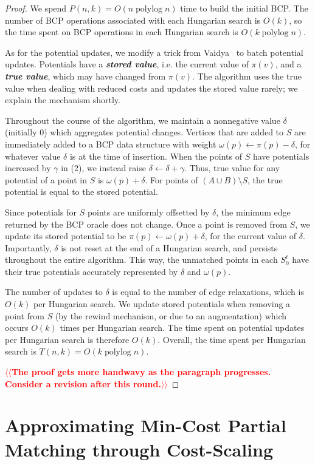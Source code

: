 \documentclass[a4paper,UKenglish]{socg-lipics-v2018}
\makeatletter
\def\note#1{\textcolor{red}{{#1}}}
\def\polylog{\mathop{\mathrm{polylog}}}
\theoremstyle{plain}
\numberwithin{figure}{section}
\def\EMPH#1{\textbf{\emph{\boldmath #1}}}
\def\n@te#1{\textsf{\boldmath \textbf{$\langle\!\langle$#1$\rangle\!\rangle$}}\leavevmode}
\def\note#1{\textcolor{red}{\n@te{#1}}}
\makeatother
\begin{document}
\begin{proof}
We spend $P(n, k) = O(n \polylog n)$ time to build the initial BCP.
The number of BCP operations associated with each Hungarian search is
$O(k)$, so the time spent on BCP operations in each Hungarian search
is $O(k \polylog n)$.

As for the potential updates, we modify a trick from Vaidya~\cite{Vaidya89} to
batch potential updates.
Potentials have a \EMPH{stored value}, i.e. the current value of $\pi(v)$,
and a \EMPH{true value}, which may have changed from $\pi(v)$.
The algorithm uses the true value when dealing with reduced costs and updates
the stored value rarely; we explain the mechanism shortly.

Throughout the course of the algorithm, we maintain a nonnegative value
$\delta$ (initially 0) which aggregates potential changes.
Vertices that are added to $S$ are immediately added to a BCP data structure
with weight $\omega(p) \gets \pi(p) - \delta$, for whatever value $\delta$ is
at the time of insertion.
When the points of $S$ have potentials increased by $\gamma$ in (2), we instead
raise $\delta \gets \delta + \gamma$.
Thus, true value for any potential of a point in $S$ is $\omega(p) + \delta$.
For points of $(A \cup B) \setminus S$, the true potential is equal to the
stored potential.

Since potentials for $S$ points are uniformly offsetted by $\delta$, the
minimum edge returned by the BCP oracle does not change.
Once a point is removed from $S$, we update its stored potential
to be $\pi(p) \gets \omega(p) + \delta$, for the current value of $\delta$.
Importantly, $\delta$ is not reset at the end of a Hungarian search, and
persists throughout the entire algorithm.
This way, the unmatched points in each $S^t_0$ have their true potentials
accurately represented by $\delta$ and $\omega(p)$.

The number of updates to $\delta$ is equal to the number of edge relaxations,
which is $O(k)$ per Hungarian search.
We update stored potentials when removing a point from $S$ (by the rewind
mechanism, or due to an augmentation) which occurs $O(k)$ times per Hungarian
search.
The time spent on potential updates per Hungarian search is therefore $O(k)$.
Overall, the time spent per Hungarian search is $T(n, k) = O(k\polylog n)$.

\note{The proof gets more handwavy as the paragraph progresses.  Consider a revision after this round.}
\end{proof}


\section{Approximating Min-Cost Partial Matching through Cost-Scaling}
\label{section:goldberg}
\end{document}
